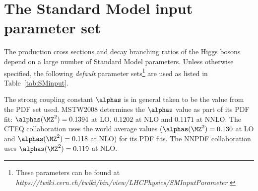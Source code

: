 \section{The Standard Model input parameter set}
\label{sminput}

The production cross sections and decay branching ratios of the Higgs bosons depend on a large number of Standard Model parameters.
Unless otherwise specified, the following {\em default} parameter sets\footnote{These parameters can be found at {\sl https://twiki.cern.ch/twiki/bin/view/LHCPhysics/SMInputParameter }}
are used as listed in Table~\ref{tab:SMinput}.

The strong coupling constant $\alphas$ is in general taken to be the value from the PDF set used.
MSTW2008 determines the $\alphas$ value as part of its PDF fit: $\alphas(\MZ^2)=0.1394$ at LO,  $0.1202$ at NLO and $0.1171$ at NNLO.
The CTEQ collaboration uses the world  average values ($\alphas(\MZ^2)=0.130$ at LO and  $\alphas(\MZ^2)=0.118$ at NLO) for its PDF fits.
The NNPDF collaboration uses $\alphas(\MZ^2)=0.119$ at NLO.

